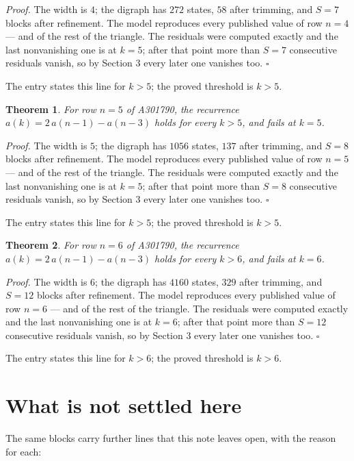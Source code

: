 \documentclass[11pt]{article}
\newtheorem{theorem}{Theorem}
\theoremstyle{definition}
\begin{document}
{\itshape Proof.} The width is $4$; the digraph has $272$ states, $58$ after trimming, and $S = 7$ blocks after refinement. The model reproduces every published value of row $n = 4$ --- and of the rest of the triangle. The residuals were computed exactly and the last nonvanishing one is at $k = 5$; after that point more than $S = 7$ consecutive residuals vanish, so by Section 3 every later one vanishes too. $\square$

The entry states this line for $k > 5$; the proved threshold is $k > 5$.

\begin{theorem} For row $n = 5$ of A301790, the recurrence $a(k) = 2\,a(n-1) - a(n-3)$ holds for every $k > 5$, and fails at $k = 5$.\end{theorem}

{\itshape Proof.} The width is $5$; the digraph has $1056$ states, $137$ after trimming, and $S = 8$ blocks after refinement. The model reproduces every published value of row $n = 5$ --- and of the rest of the triangle. The residuals were computed exactly and the last nonvanishing one is at $k = 5$; after that point more than $S = 8$ consecutive residuals vanish, so by Section 3 every later one vanishes too. $\square$

The entry states this line for $k > 5$; the proved threshold is $k > 5$.

\begin{theorem} For row $n = 6$ of A301790, the recurrence $a(k) = 2\,a(n-1) - a(n-3)$ holds for every $k > 6$, and fails at $k = 6$.\end{theorem}

{\itshape Proof.} The width is $6$; the digraph has $4160$ states, $329$ after trimming, and $S = 12$ blocks after refinement. The model reproduces every published value of row $n = 6$ --- and of the rest of the triangle. The residuals were computed exactly and the last nonvanishing one is at $k = 6$; after that point more than $S = 12$ consecutive residuals vanish, so by Section 3 every later one vanishes too. $\square$

The entry states this line for $k > 6$; the proved threshold is $k > 6$.

\section{What is not settled here}

The same blocks carry further lines that this note leaves open, with the reason for each:
\end{document}
